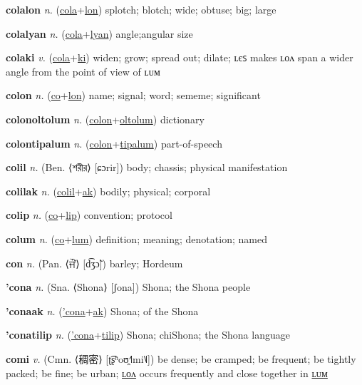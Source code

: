 \textbf{\hypertarget{colalon}{colalon}} \textit{n.} (\hyperlink{cola}{cola}+\allowbreak \hyperlink{lon}{lon})
splotch; blotch; wide; obtuse; big; large

\textbf{\hypertarget{colalyan}{colalyan}} \textit{n.} (\hyperlink{cola}{cola}+\allowbreak \hyperlink{lyan}{lyan})
angle;angular size

\textbf{\hypertarget{colaki}{colaki}} \textit{v.} (\hyperlink{cola}{cola}+\allowbreak \hyperlink{ki}{ki})
widen; grow; spread out; dilate; ʟєꜱ makes ʟᴏᴧ span a wider angle from the point of view of ʟᴜᴍ

\textbf{\hypertarget{colon}{colon}} \textit{n.} (\hyperlink{co}{co}+\allowbreak \hyperlink{lon}{lon})
name; signal; word; sememe; significant

\textbf{\hypertarget{colonoltolum}{colonoltolum}} \textit{n.} (\hyperlink{colon}{colon}+\allowbreak \hyperlink{oltolum}{oltolum})
dictionary

\textbf{\hypertarget{colontipalum}{colontipalum}} \textit{n.} (\hyperlink{colon}{colon}+\allowbreak \hyperlink{tipalum}{tipalum})
part-of-speech

\textbf{\hypertarget{colil}{colil}} \textit{n.} (Ben. ⟨{\bengali{}শরীর}⟩ [ɕɔrir])
body; chassis; physical manifestation

\textbf{\hypertarget{colilak}{colilak}} \textit{n.} (\hyperlink{colil}{colil}+\allowbreak \hyperlink{ak}{ak})
bodily; physical; corporal

\textbf{\hypertarget{colip}{colip}} \textit{n.} (\hyperlink{co}{co}+\allowbreak \hyperlink{lip}{lip})
convention; protocol

\textbf{\hypertarget{colum}{colum}} \textit{n.} (\hyperlink{co}{co}+\allowbreak \hyperlink{lum}{lum})
definition; meaning; denotation; named

\textbf{\hypertarget{con}{con}} \textit{n.} (Pan. ⟨{\gurmukhi{}ਜੌਂ}⟩ [d͡ʒɔ̃])
barley; Hordeum

\textbf{\hypertarget{'cona}{'cona}} \textit{n.} (Sna. ⟨Shona⟩ [ʃona])
Shona; the Shona people

\textbf{\hypertarget{'conaak}{'conaak}} \textit{n.} (\hyperlink{'cona}{'cona}+\allowbreak \hyperlink{ak}{ak})
Shona; of the Shona

\textbf{\hypertarget{'conatilip}{'conatilip}} \textit{n.} (\hyperlink{'cona}{'cona}+\allowbreak \hyperlink{tilip}{tilip})
Shona; chiShona; the Shona language

\textbf{\hypertarget{comi}{comi}} \textit{v.} (Cmn. ⟨{\chinese{}稠密}⟩ [ʈ͡ʂʰoʊ̯˧˥mi˥˩])
be dense; be cramped; be frequent; be tightly packed; be fine; be urban; \hyperlink{comilon}{ʟᴏᴧ} occurs frequently and close together in \hyperlink{comilum}{ʟᴜᴍ}

